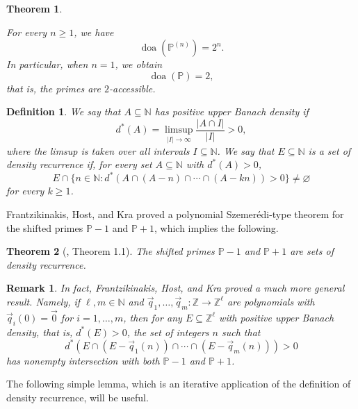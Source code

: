 \documentclass[10pt,a4paper]{amsart}
\newtheorem{theorem}{Theorem}
\newtheorem{definition}{Definition}
\newtheorem{remark}{Remark}
\begin{document}
\begin{theorem}\label{thm:primes}

For every $n \geq 1$, we have $$\operatorname{doa}(\mathbb{P}^{(n)})=2^n.$$ In particular, when $n=1$, we obtain $$\operatorname{doa}(\mathbb{P})=2,$$ that is, the primes are $2$-accessible.
    
\end{theorem}
    

\begin{definition}

We say that $A \subseteq \mathbb{N}$ has \textit{positive upper Banach density} if $$d^*(A)=\limsup_{|I| \to \infty}\frac{|A \cap I|}{|I|}>0,$$ where the limsup is taken over all intervals $I \subseteq \mathbb{N}$. We say that $E \subseteq \mathbb{N}$ is a set of \textit{density recurrence} if, for every set $A \subseteq \mathbb{N}$ with $d^*(A)>0$, $$E \cap \{n \in \mathbb{N} : d^*\left(A \cap (A-n) \cap \cdots \cap (A-kn)\right)>0\} \neq \varnothing$$ for every $k \geq 1$.
    
\end{definition}

Frantzikinakis, Host, and Kra proved a polynomial Szemerédi-type theorem for the shifted primes $\mathbb{P}-1$ and $\mathbb{P}+1$, which implies the following.

\begin{theorem}[\cite{frantzikinakis2013polynomial}, Theorem 1.1]\label{thm:frant}
The shifted primes $\mathbb{P}-1$ and $\mathbb{P}+1$ are sets of density recurrence. 
\end{theorem}

\begin{remark} 

In fact, Frantzikinakis, Host, and Kra proved a much more general result. Namely, if $\ell,m \in \mathbb{N}$ and $\vec{q}_1,\dots,\vec{q}_m:\mathbb{Z}\to \mathbb{Z}^{\ell}$ 
are polynomials with $\vec{q}_i(0)=\vec{0}$ for $i=1,\dots,m$, then for any $E\subseteq \mathbb{Z}^{\ell}$ with positive upper Banach density, 
that is, $d^*(E)>0$, the set of integers $n$ such that
$$
d^*\left(
E\cap (E-\vec{q}_1(n))\cap \cdots \cap (E-\vec{q}_m(n))
\right)>0
$$
has nonempty intersection with both $\mathbb{P}-1$ and $\mathbb{P}+1$.
    
\end{remark}

The following simple lemma, which is an iterative application of the definition of density recurrence, will be useful.
\end{document}

